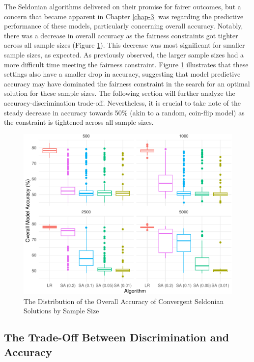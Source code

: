 \documentclass[12pt, twoside]{amherstthesis}
\begin{document}
The Seldonian algorithms delivered on their promise for fairer outcomes, but a concern that became apparent in Chapter \ref{chap-3} was regarding the predictive performance of these models, particularly concerning overall accuracy. Notably, there was a decrease in overall accuracy as the fairness constraints got tighter across all sample sizes (Figure \ref{fig:ch4fig3}). This decrease was most significant for smaller sample sizes, as expected. As previously observed, the larger sample sizes had a more difficult time meeting the fairness constraint. Figure \ref{fig:ch4fig3} illustrates that these settings also have a smaller drop in accuracy, suggesting that model predictive accuracy may have dominated the fairness constraint in the search for an optimal solution for these sample sizes. The following section will further analyze the accuracy-discrimination trade-off. Nevertheless, it is crucial to take note of the steady decrease in accuracy towards 50\% (akin to a random, coin-flip model) as the constraint is tightened across all sample sizes.
\begin{figure}

{\centering \includegraphics{Dasha-Asienga_StatThesis_files/figure-latex/ch4fig3-1} 

}

\caption{The Distribution of the Overall Accuracy of Convergent Seldonian Solutions by Sample Size}\label{fig:ch4fig3}
\end{figure}
\hypertarget{the-trade-off-between-discrimination-and-accuracy}{%
\subsection{The Trade-Off Between Discrimination and Accuracy}\label{the-trade-off-between-discrimination-and-accuracy}}
\end{document}
